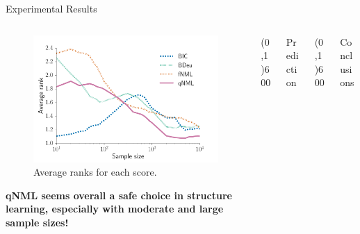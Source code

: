 \documentclass[final]{beamer}
\newcommand{\heading}[1]{\alert{\large #1}\\}
\theoremstyle{plain}
\begin{document}
\begin{frame}{}
\begin{block}{Experimental Results}
\begin{columns}[T]
\begin{column}{0.35\textwidth}
\begin{minipage}{0.45\textwidth}
\begin{figure}[h]
		\includegraphics[width=\columnwidth]{shd_rank_all.pdf}
		\caption{Average ranks for each score.}
		\label{fig:all_shd}
		\end{figure}
	  \end{minipage}
	  
	\vspace*{12pt}
	\textbf{qNML seems overall a safe choice in structure learning, especially with moderate and large sample sizes!} 
    \end{column}
   \begin{column}{0.005\textwidth}\linethickness{0.3ex}
      \color{myPurple} \line(0,1){600}
   \end{column} %
   
    \begin{column}{0.23\textwidth}
    \heading{Prediction}
      
    \end{column}
    
    \begin{column}{0.005\textwidth}\linethickness{0.3ex} %
      \color{myPurple} \line(0,1){600}
   \end{column} %
    \begin{column}{0.3\textwidth}
    \heading{Conclusions}

    \end{column}
  \end{columns}
\end{block}


\end{frame}
\end{document}
